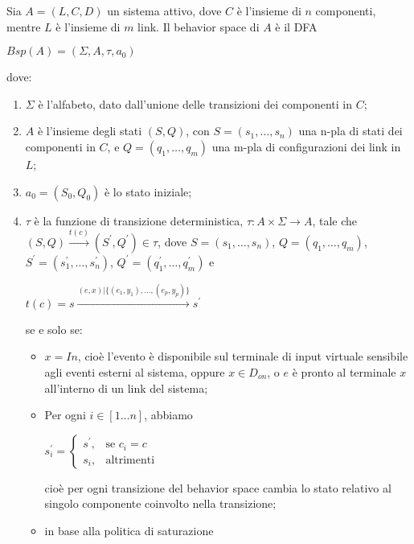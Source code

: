 \begin{defn}
Sia $A = (L,C,D)$ un sistema attivo, dove $C$ è l'insieme di $n$ componenti, mentre $L$ è l'insieme di $m$ link. Il behavior space di $A$ è il DFA
\begin{center}
	$Bsp(A) = (\Sigma,A,\tau,a_0)$
\end{center}
dove:
\begin{enumerate}
\item $\Sigma$ è l'alfabeto, dato dall'unione delle transizioni dei componenti in $C$;
\item $A$  è l'insieme degli stati $(S,Q)$, con $S = (s_1,\ldots,s_n)$ una n-pla di stati dei componenti in $C$, e $Q = (q_1, \ldots,q_m)$ una m-pla di configurazioni dei link in $L$;
\item $a_0 = (S_0,Q_0)$ è lo stato iniziale;
\item $\tau$ è la funzione di transizione deterministica, $\tau: A \times \Sigma \rightarrow A$, tale che $(S,Q) \xrightarrow{t(c)} (S^\prime, Q^\prime) \in \tau$, dove $S = (s_1, \ldots,s_n)$, $Q = (q_1, \ldots,q_m)$, $S^\prime = (s^\prime_1, \ldots,s^\prime_n)$, $Q^\prime = (q^\prime_1, \ldots,q^\prime_m)$ e
\begin{center}
$t(c) = s \xrightarrow{(e,x) | \{(e_1,y_1), \ldots, (e_p,y_p)\}} s^\prime$
\end{center}
se e solo se:
\begin{itemize}
\item $x = In$, cioè l'evento è disponibile sul terminale di input virtuale sensibile agli eventi esterni al sistema, oppure $x \in D_{on}$, o $e$ è pronto al terminale $x$ all'interno di un link del sistema;
\item Per ogni $i \in [1 \ldots n]$, abbiamo
\begin{center}
$s^\prime_i = \begin{cases} s^\prime, & \mbox{se }c_i = c\\ s_i, & \mbox{altrimenti} \end{cases}$
\end{center}
cioè per ogni transizione del behavior space cambia lo stato relativo al singolo componente coinvolto nella transizione;
\item in base alla politica di saturazione
\end{itemize}
\end{enumerate}
\end{defn}

